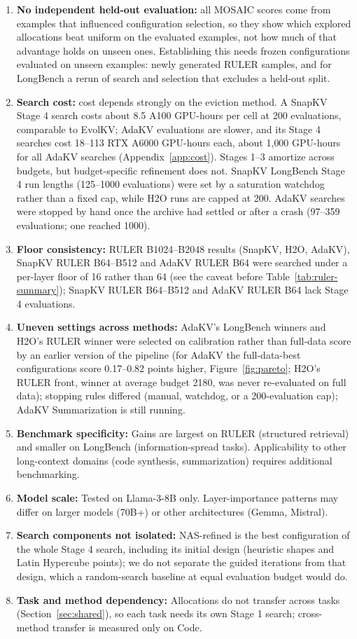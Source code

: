 \documentclass[11pt]{article}
\begin{document}
\begin{enumerate}
\item \textbf{No independent held-out evaluation:} all MOSAIC scores come from examples that influenced configuration selection, so they show which explored allocations beat uniform on the evaluated examples, not how much of that advantage holds on unseen ones. Establishing this needs frozen configurations evaluated on unseen examples: newly generated RULER samples, and for LongBench a rerun of search and selection that excludes a held-out split.
\item \textbf{Search cost:} cost depends strongly on the eviction method. A SnapKV Stage 4 search costs about 8.5 A100 GPU-hours per cell at 200 evaluations, comparable to EvolKV; AdaKV evaluations are slower, and its Stage 4 searches cost 18--113 RTX A6000 GPU-hours each, about 1{,}000 GPU-hours for all AdaKV searches (Appendix~\ref{app:cost}). Stages 1--3 amortize across budgets, but budget-specific refinement does not. SnapKV LongBench Stage 4 run lengths (125--1000 evaluations) were set by a saturation watchdog rather than a fixed cap, while H2O runs are capped at 200. AdaKV searches were stopped by hand once the archive had settled or after a crash (97--359 evaluations; one reached 1000).
\item \textbf{Floor consistency:} RULER B1024--B2048 results (SnapKV, H2O, AdaKV), SnapKV RULER B64--B512 and AdaKV RULER B64 were searched under a per-layer floor of 16 rather than 64 (see the caveat before Table~\ref{tab:ruler-summary}); SnapKV RULER B64--B512 and AdaKV RULER B64 lack Stage 4 evaluations.
\item \textbf{Uneven settings across methods:} AdaKV's LongBench winners and H2O's RULER winner were selected on calibration rather than full-data score by an earlier version of the pipeline (for AdaKV the full-data-best configurations score 0.17--0.82 points higher, Figure~\ref{fig:pareto}; H2O's RULER front, winner at average budget 2180, was never re-evaluated on full data); stopping rules differed (manual, watchdog, or a 200-evaluation cap); AdaKV Summarization is still running.
\item \textbf{Benchmark specificity:} Gains are largest on RULER (structured retrieval) and smaller on LongBench (information-spread tasks). Applicability to other long-context domains (code synthesis, summarization) requires additional benchmarking.
\item \textbf{Model scale:} Tested on Llama-3-8B only. Layer-importance patterns may differ on larger models (70B+) or other architectures (Gemma, Mistral).
\item \textbf{Search components not isolated:} NAS-refined is the best configuration of the whole Stage 4 search, including its initial design (heuristic shapes and Latin Hypercube points); we do not separate the guided iterations from that design, which a random-search baseline at equal evaluation budget would do.
\item \textbf{Task and method dependency:} Allocations do not transfer across tasks (Section~\ref{sec:shared}), so each task needs its own Stage 1 search; cross-method transfer is measured only on Code.
\end{enumerate}

\FloatBarrier




\end{document}
